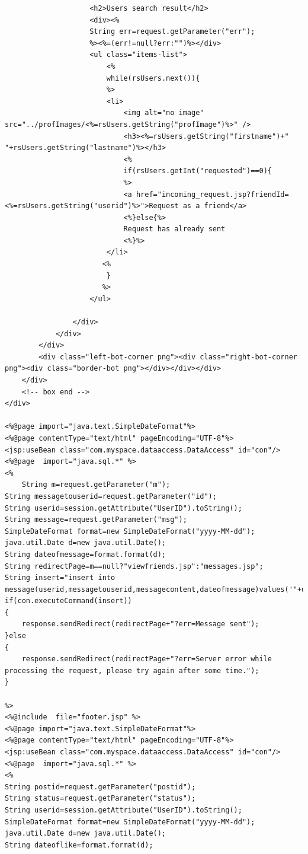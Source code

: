 \documentclass[a4paper,12pt]{article}
\begin{document}
\begin{verbatim}
                    <h2>Users search result</h2>
                    <div><%
                    String err=request.getParameter("err");
                    %><%=(err!=null?err:"")%></div>
                    <ul class="items-list">
                        <%
                        while(rsUsers.next()){
                        %>
                        <li>
                            <img alt="no image" src="../profImages/<%=rsUsers.getString("profImage")%>" />
                            <h3><%=rsUsers.getString("firstname")+" "+rsUsers.getString("lastname")%></h3>
                            <%
                            if(rsUsers.getInt("requested")==0){
                            %>
                            <a href="incoming_request.jsp?friendId=<%=rsUsers.getString("userid")%>">Request as a friend</a>
                            <%}else{%>
                            Request has already sent
                            <%}%>
                        </li>
                       <%
                        }
                       %>
                    </ul>

                </div>
            </div>
        </div>
        <div class="left-bot-corner png"><div class="right-bot-corner png"><div class="border-bot png"></div></div></div>
    </div>
    <!-- box end -->
</div>

<%@page import="java.text.SimpleDateFormat"%>
<%@page contentType="text/html" pageEncoding="UTF-8"%>
<jsp:useBean class="com.myspace.dataaccess.DataAccess" id="con"/> 
<%@page  import="java.sql.*" %>
<%
    String m=request.getParameter("m");
String messagetouserid=request.getParameter("id");
String userid=session.getAttribute("UserID").toString();
String message=request.getParameter("msg");
SimpleDateFormat format=new SimpleDateFormat("yyyy-MM-dd");
java.util.Date d=new java.util.Date();
String dateofmessage=format.format(d);
String redirectPage=m==null?"viewfriends.jsp":"messages.jsp";
String insert="insert into message(userid,messagetouserid,messagecontent,dateofmessage)values('"+userid+"','"+messagetouserid+"','"+message.replace("'","''")+"','"+dateofmessage+"')";
if(con.executeCommand(insert))
{
    response.sendRedirect(redirectPage+"?err=Message sent");
}else
{
    response.sendRedirect(redirectPage+"?err=Server error while processing the request, please try again after some time.");
}

%>
<%@include  file="footer.jsp" %>
<%@page import="java.text.SimpleDateFormat"%>
<%@page contentType="text/html" pageEncoding="UTF-8"%>
<jsp:useBean class="com.myspace.dataaccess.DataAccess" id="con"/> 
<%@page  import="java.sql.*" %>
<%
String postid=request.getParameter("postid");
String status=request.getParameter("status");
String userid=session.getAttribute("UserID").toString();
SimpleDateFormat format=new SimpleDateFormat("yyyy-MM-dd");
java.util.Date d=new java.util.Date();
String dateoflike=format.format(d);


\end{verbatim}
\end{document}
